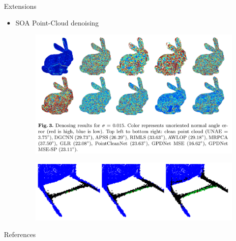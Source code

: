\documentclass{beamer}
\begin{document}
\begin{frame}{Extensions}
\begin{itemize}
\item SOA Point-Cloud denoising \cite{PistilliECCV20}
\begin{figure}[H]
\includegraphics[width=0.5\linewidth]{../imgs/pcdn.png}
\end{figure}
\begin{figure}[H]
\includegraphics[width=0.5\linewidth]{../imgs/pcdn_receptive.png}
\end{figure}
\end{itemize}
\end{frame}

\begin{frame}[allowframebreaks]{References}
\nocite{*}
\printbibliography
\end{frame}
\end{document}
